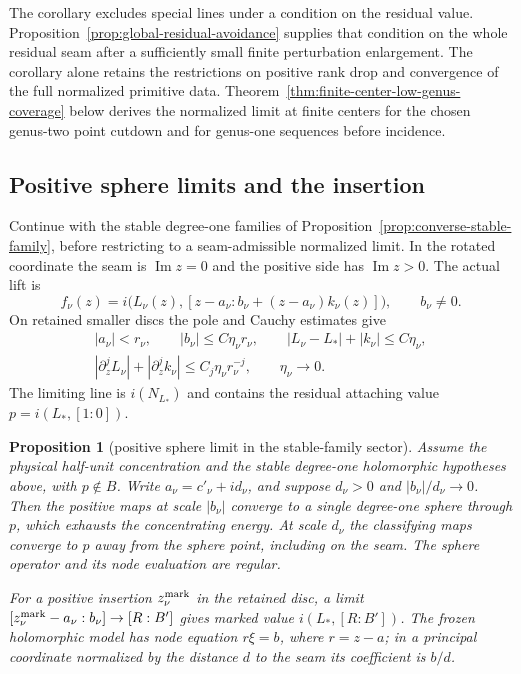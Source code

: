 \documentclass[11pt]{amsart}
\newtheorem{proposition}[theorem]{Proposition}
\theoremstyle{definition}
\theoremstyle{remark}
\theoremstyle{plain}
\begin{document}
The corollary excludes special lines under a condition on the
residual value. Proposition~\ref{prop:global-residual-avoidance}
supplies that condition on the whole residual seam after a
sufficiently small finite perturbation enlargement.
The corollary alone retains the restrictions on positive rank drop
and convergence of the full normalized primitive data.
Theorem~\ref{thm:finite-center-low-genus-coverage} below derives
the normalized limit at finite centers for the chosen genus-two
point cutdown and for genus-one sequences before incidence.

\subsection{Positive sphere limits and the insertion}
\label{sec:positive-sphere-repair}

Continue with the stable degree-one families of
Proposition~\ref{prop:converse-stable-family}, before restricting
to a seam-admissible normalized limit. In the rotated coordinate
the seam is $\operatorname{Im}z=0$ and the positive side has
$\operatorname{Im}z>0$. The actual lift is
\begin{equation}\label{eq:positive-sphere-actual-lift}
 f_\nu(z)=i\bigl(L_\nu(z),
       [z-a_\nu:b_\nu+(z-a_\nu)k_\nu(z)]\bigr),\qquad b_\nu\ne0.
\end{equation}
On retained smaller discs the pole and Cauchy estimates give
\begin{equation}\label{eq:positive-sphere-slow-bounds}
 \begin{gathered}
 |a_\nu|<r_\nu,\qquad |b_\nu|\leq C\eta_\nu r_\nu,\qquad
 |L_\nu-L_*|+|k_\nu|\leq C\eta_\nu,\\
 |\partial_z^jL_\nu|+|\partial_z^jk_\nu|
             \leq C_j\eta_\nu r_\nu^{-j},\qquad \eta_\nu\to0.
 \end{gathered}
\end{equation}
The limiting line is $i(N_{L_*})$ and contains the residual
attaching value $p=i(L_*,[1:0])$.

\begin{proposition}[positive sphere limit in the stable-family sector]
\label{prop:positive-sphere-limit}
Assume the physical half-unit concentration and the stable
degree-one holomorphic hypotheses above, with $p\notin B$.
Write $a_\nu=c'_\nu+i d_\nu$, and suppose
$d_\nu>0$ and $|b_\nu|/d_\nu\to0$.
Then the positive maps at scale $|b_\nu|$ converge to a single
degree-one sphere through $p$, which exhausts the concentrating
energy. At scale $d_\nu$ the classifying maps converge to $p$
away from the sphere point, including on the seam.
The sphere operator and its node evaluation are regular.

For a positive insertion $z_\nu^{\rm mark}$ in the retained
disc, a limit $[z_\nu^{\rm mark}-a_\nu:b_\nu]\to[R:B']$
gives marked value $i(L_*,[R:B'])$.
The frozen holomorphic model has node equation $r\xi=b$,
where $r=z-a$; in a principal coordinate normalized by
the distance $d$ to the seam its coefficient is $b/d$.
\end{proposition}
\end{document}
